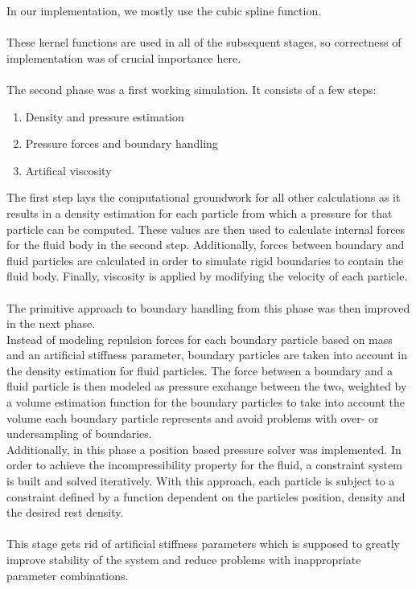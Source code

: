 \documentclass{ACGSeminar}
\begin{document}
In our implementation, we mostly use the cubic spline function.\\
\\
These kernel functions are used in all of the subsequent stages, so correctness of implementation was of crucial importance here.\\
\\
The second phase was a first working simulation. It consists of a few steps:\\
\begin{enumerate}
\item Density and pressure estimation
\item Pressure forces and boundary handling
\item Artifical viscosity
\end{enumerate}
The first step lays the computational groundwork for all other calculations as it results in a density estimation for each particle from which a pressure for that particle can be computed.
These values are then used to calculate internal forces for the fluid body in the second step. Additionally, forces between boundary and fluid particles are calculated in order to simulate rigid boundaries to contain the fluid body.
Finally, viscosity is applied by modifying the velocity of each particle.\\
\\
The primitive approach to boundary handling from this phase was then improved in the next phase. \\
Instead of modeling repulsion forces for each boundary particle based on mass and an artificial stiffness parameter, boundary particles are taken into account in the density estimation for fluid particles. The force between a boundary and a fluid particle is then modeled as pressure exchange between the two, weighted by a volume estimation function for the boundary particles to take into account the volume each boundary particle represents and avoid problems with over- or undersampling of boundaries. \\
Additionally, in this phase a position based pressure solver was implemented. In order to achieve the incompressibility property for the fluid, a constraint system is built and solved iteratively. With this approach, each particle is subject to a constraint defined by a function dependent on the particles position, density and the desired rest density.\\
\\
This stage gets rid of artificial stiffness parameters which is supposed to greatly improve stability of the system and reduce problems with inappropriate parameter combinations.  \\
\end{document}
